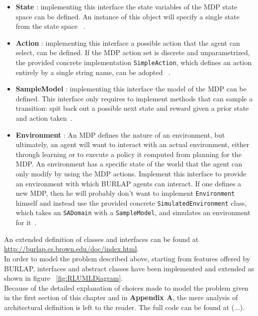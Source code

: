 \begin{itemize}
	\item \textbf{State} : implementing this interface the state variables of the MDP state space can be defined. An instance of this object will specify a single state from the state space~\cite{BURLAPSite} .
	\item \textbf{Action} : implementing this interface a possible action that the agent can select, can be defined. If the MDP action set is discrete and unparametrized, the provided concrete implementation {\tt SimpleAction}, which defines an action entirely by a single string name, can be adopted ~\cite{BURLAPSite}.
	\item \textbf{SampleModel} : implementing this interface the model of the MDP can be defined. This interface only requires to implement methods that can sample a transition: spit back out a possible next state and reward given a prior state and action taken~\cite{BURLAPSite}.
	\item  \textbf{Environment} : An MDP defines the nature of an environment, but ultimately, an agent will want to interact with an actual environment, either through learning or to execute a policy it computed from planning for the MDP. An environment has a specific state of the world that the agent can only modify by using the MDP actions. Implement this interface to provide an environment with which BURLAP agents can interact. If one defines a new MDP, then he will probably don't want to implement {\tt Environment} himself and instead use the provided concrete {\tt SimulatedEnvironment} class, which takes an {\tt SADomain} with a {\tt SampleModel}, and simulates an environment for it~\cite{BURLAPSite}.
\end{itemize}

An extended definition of classes and interfaces can be found at \url{http://burlap.cs.brown.edu/doc/index.html}. \\

In order to model the problem described above, starting from features offered by BURLAP, interfaces and abstract classes have been implemented and extended as shown in figure ~\ref{fig:RLUMLDiagram}. \\

Because of the detailed explanation of choices made to model the problem given in the first section of this chapter and in \textbf{Appendix A}, the mere analysis of architectural definition is left to the reader. The full code can be found at (...).

